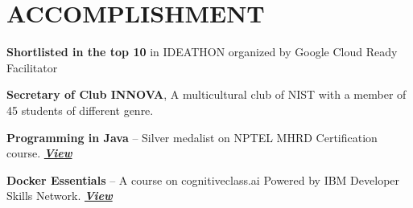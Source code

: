 \section{ACCOMPLISHMENT}
\resumeSubHeadingListStart

    \resumeProjectHeading
    {\textbf{Shortlisted in the top 10} in IDEATHON organized by Google Cloud Ready Facilitator}    {}

    \resumeProjectHeading
    {\textbf{Secretary of Club INNOVA}, A multicultural club of NIST with a member of 45 students of different genre.}      {}

    \resumeProjectHeading
    {\textbf{Programming in Java} -- Silver medalist on NPTEL MHRD Certification course.}    {\href{https://archive.nptel.ac.in/noc/Ecertificate/?q=NPTEL22CS102S5307011910019355}{\textit{\textbf{View}}}}


    \resumeProjectHeading
    {\textbf{Docker Essentials} -- A course on cognitiveclass.ai Powered by IBM Developer Skills Network.}    {\href{https://courses.cognitiveclass.ai/certificates/94c8ec1c510841e1a5566c4f9f63d39a}{\textit{\textbf{View}}}}
\resumeSubHeadingListEnd